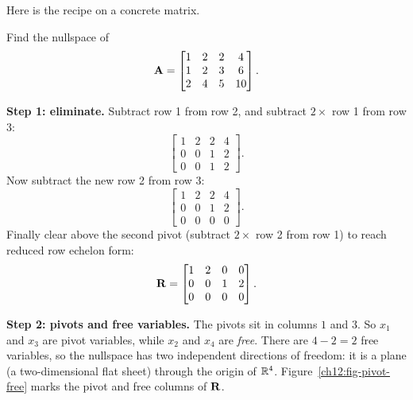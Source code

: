 Here is the recipe on a concrete matrix.

\begin{example}\label{ch12:big-null}
Find the nullspace of
\[
  \mathbf{A} = \begin{bmatrix}
    1 & 2 & 2 & 4 \\
    1 & 2 & 3 & 6 \\
    2 & 4 & 5 & 10
  \end{bmatrix}.
\]

\textbf{Step 1: eliminate.} Subtract row 1 from row 2, and subtract $2\times$ row
1 from row 3:
\[
  \begin{bmatrix}
    1 & 2 & 2 & 4 \\
    0 & 0 & 1 & 2 \\
    0 & 0 & 1 & 2
  \end{bmatrix}.
\]
Now subtract the new row 2 from row 3:
\[
  \begin{bmatrix}
    1 & 2 & 2 & 4 \\
    0 & 0 & 1 & 2 \\
    0 & 0 & 0 & 0
  \end{bmatrix}.
\]
Finally clear above the second pivot (subtract $2\times$ row 2 from row 1) to
reach reduced row echelon form:
\[
  \mathbf{R} = \begin{bmatrix}
    1 & 2 & 0 & 0 \\
    0 & 0 & 1 & 2 \\
    0 & 0 & 0 & 0
  \end{bmatrix}.
\]

\textbf{Step 2: pivots and free variables.} The pivots sit in columns $1$ and
$3$. So $x_1$ and $x_3$ are pivot variables, while $x_2$ and $x_4$ are
\emph{free}. There are $4-2=2$ free variables, so the nullspace has two
independent directions of freedom:
it is a plane (a two-dimensional flat sheet) through the origin of $\mathbb{R}^4$.
Figure~\ref{ch12:fig-pivot-free} marks the pivot and free columns of $\mathbf{R}$.


\end{example}
